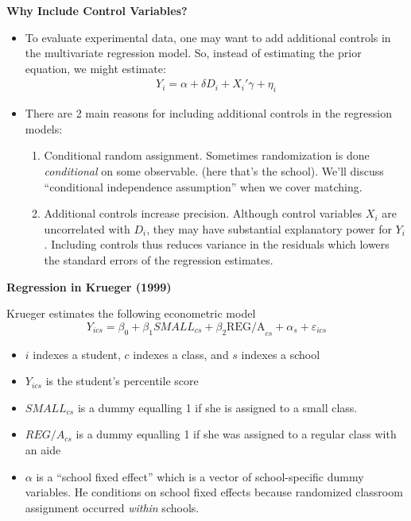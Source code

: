 \documentclass{beamer}
\begin{document}
\begin{frame}[plain]
	\begin{center}
	\textbf{Why Include Control Variables?}
	\end{center}
	
	\begin{itemize}
	\item To evaluate experimental data, one may want to add additional controls in the multivariate regression model.  So, instead of estimating the prior equation, we might estimate:
		\begin{eqnarray*}
		Y_i = \alpha + \delta D_i + X_i'\gamma + \eta_i
		\end{eqnarray*}
	\item There are 2 main reasons for including additional controls in the regression models:
		\begin{enumerate}
		\item Conditional random assignment.  Sometimes randomization is done \emph{conditional} on some observable.  (here that's the school).  We'll discuss ``conditional independence assumption'' when we cover matching.
		\item Additional controls increase precision.  Although control variables $X_i$ are uncorrelated with $D_i$, they may have substantial explanatory power for $Y_i$. Including controls thus reduces variance in the residuals which lowers the standard errors of the regression estimates.
		\end{enumerate}
	\end{itemize}
\end{frame}

\begin{frame}[plain]
	\begin{center}
	\textbf{Regression in Krueger (1999)}
	\end{center}
	
Krueger estimates the following econometric model$$Y_{ics} = \beta_0 + \beta_1 SMALL_{cs} + \beta_2 \text{REG/A}_{cs} + \alpha_s + \varepsilon_{ics}$$\begin{itemize}\item $i$ indexes a student, $c$ indexes a class, and $s$ indexes a school
		\item $Y_{ics}$ is the student's percentile score
		\item $SMALL_{cs}$ is a dummy equalling 1 if she is assigned to a small class.
		\item $REG/A_{cs}$ is a dummy equalling 1 if she was assigned to a regular class with an aide
		\item $\alpha$ is a ``school fixed effect'' which is a vector of school-specific dummy variables.  He conditions on school fixed effects because randomized classroom assignment occurred \emph{within} schools. 
		\end{itemize}
\end{frame}
\end{document}
